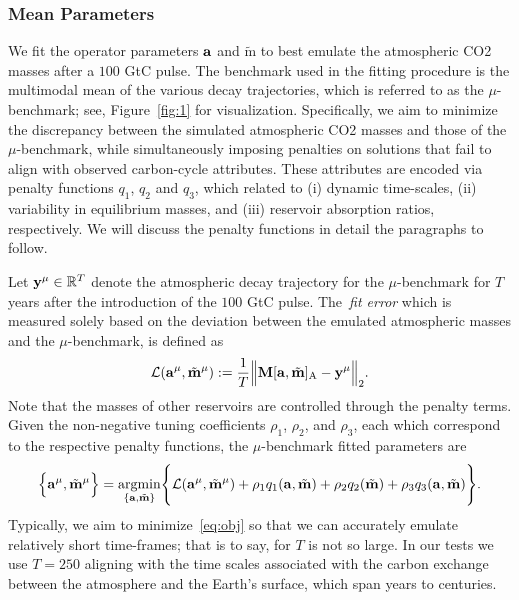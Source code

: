 \documentclass[11pt, a4paper, pdftex, twoside, dvipsnames]{article}
\renewcommand{\ref}{\cref}
\newcommand{\bb}[1]{\boldsymbol{\bold{#1}}}
\newcommand{\bbt}[1]{\tilde{\boldsymbol{\mathrm{#1}}}}
\newcommand{\argmin}[1]{\underset{#1}{\text{argmin}} }
\newcommand{\ameq}[0]{\bb{a},\bbt{m}}
\begin{document}
\subsubsection{Mean Parameters} \label{sec:2.2.1}
We fit the operator parameters $\bb{a}$ and $\bbt{m}$ to best emulate the atmospheric CO2 masses after a $100$ GtC pulse.
%
The benchmark used in the fitting procedure is the multimodal mean of the various decay trajectories, which is referred to as the $\mu$-benchmark; see, Figure~\ref{fig:1} for visualization.
%
Specifically, we aim to minimize the discrepancy between the simulated atmospheric CO2 masses and those of the $\mu$-benchmark, while simultaneously imposing penalties on solutions that fail to align with observed carbon-cycle attributes.
%
These attributes are encoded via penalty functions $q_1$, $q_2$ and $q_3$, which related to (i) dynamic time-scales, (ii) variability in equilibrium masses, and (iii) reservoir absorption ratios, respectively.
%
We will discuss the penalty functions in detail the paragraphs to follow.

Let $\bb{y}^{\mu} \in \mathbb{R}^{T}$ denote the atmospheric decay trajectory for the $\mu$-benchmark for $T$ years after the introduction of the $100$ GtC pulse.
%
The~\emph{fit error} which is measured solely based on the deviation between the emulated atmospheric masses and the $\mu$-benchmark, is defined as
 \begin{align}\label{eq:fiterror}
 	\mathcal{L}(\bb{a}^{\mu},\bbt{m}^{\mu} ):=\frac{1}{T} \Big \| \bb{M}[\ameq]_\text{A} - \bb{y}^\mu \Big \|_2.
 \end{align}
%
Note that the masses of other reservoirs are controlled through the penalty terms.
%
Given the non-negative tuning coefficients $\rho_1$, $\rho_2$, and $\rho_3$, each which correspond to the respective penalty functions, the $\mu$-benchmark fitted parameters are
 \begin{align}\label{eq:obj}
	\Big \{\bb{a}^{\mu},\bbt{m}^{\mu} \Big \} = \argmin{\{ \bb{a},\bbt{m} \}}  
	\Bigg\{  
		\mathcal{L}(\bb{a}^{\mu},\bbt{m}^{\mu} )+
		\rho_1 q_1(\ameq)   +  
		\rho_2 q_2(\bbt{m}) +   
		\rho_3 q_3(\ameq)  
	\Bigg\}.
 \end{align}
%
Typically, we aim to minimize~\eqref{eq:obj} so that we can accurately emulate relatively short time-frames; that is to say, for $T$ is not so large. 
%
In our tests we use $T=250$ aligning with the time scales associated with the carbon exchange between the atmosphere and the Earth's surface, which span years to centuries.
%
%
\end{document}
